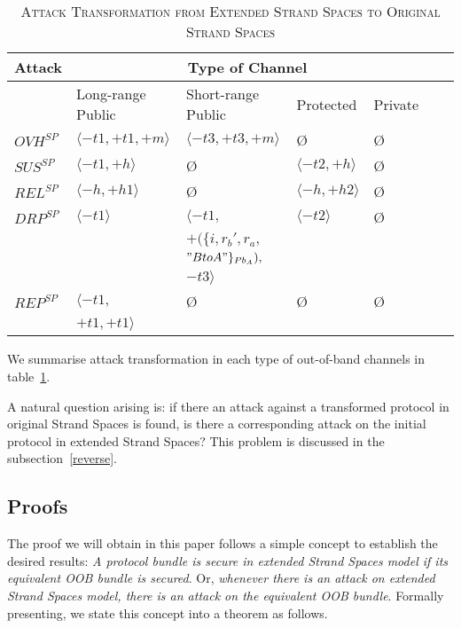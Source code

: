 \begin{table}[b]
\centering
\caption{\textsc{Attack Transformation from Extended Strand Spaces to Original Strand Spaces}}
\label{attacktrans}
{\scriptsize
\begin{tabular}{ l l l l l l l }
\hline
\multicolumn{1}{c}{Attack} & \multicolumn{4}{c}{Type of Channel} \\
\hline
\hline
 & Long-range Public & Short-range Public & Protected & Private \\
\hline\hline
$OVH^{SP}$ & $\langle -t1,+t1,+m \rangle$ & $ \langle -t3,+t3,+m \rangle$ & \O & \O \\ \hline
$SUS^{SP}$ & $ \langle -t1, +h \rangle$ & \O & $ \langle -t2,+h \rangle$ & \O \\ \hline
$REL^{SP}$ & $\langle -h, +h1 \rangle$ & \O & $ \langle -h,+h2 \rangle$ & \O \\ \hline
$DRP^{SP}$ & $ \langle -t1 \rangle$ & $ \langle -t1,$ & $\langle -t2 \rangle$ & \O \\
  &  & $+(\{i,r_b',r_a,$ & \\
  &  & $"BtoA"\}_{Pb_A}),$ & \\
  &  & $-t3 \rangle$ & \\ \hline
$REP^{SP}$ & $ \langle -t1, $ & \O & \O & \O \\
 	& $+t1,+t1 \rangle$& & &\\ \hline
\end{tabular}
}
\end{table}

We summarise attack transformation in each type of out-of-band channels in table~\ref{attacktrans}.

A natural question arising is: if there an attack against a transformed protocol in original Strand Spaces is found, is there a corresponding attack on the initial protocol in extended Strand Spaces? This problem is discussed in the subsection~\ref{reverse}. 

\subsection{Proofs}\label{proof}

The proof we will obtain in this paper follows a simple concept to establish the desired results: \emph{A protocol bundle is secure in extended Strand Spaces model if its equivalent OOB bundle is secured}. Or, \emph{whenever there is an attack on extended Strand Spaces model, there is an attack on the equivalent OOB bundle}. Formally presenting, we state this concept into a theorem as follows. 

